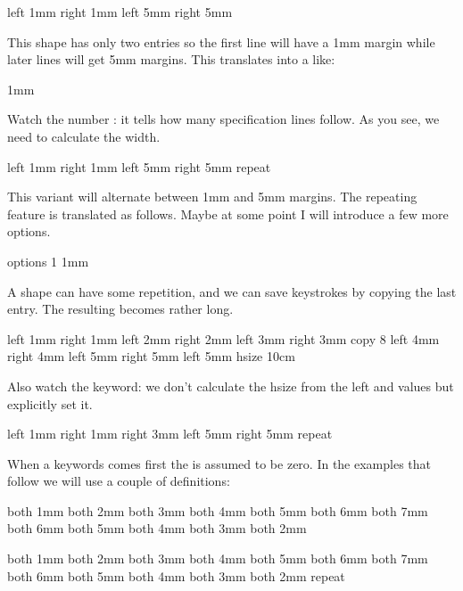 \starttyping[option=TEX]
\startparagraphshape[test]
    left 1mm right 1mm
    left 5mm right 5mm
\stopparagraphshape
\stoptyping

This shape has only two entries so the first line will have a 1mm margin while
later lines will get 5mm margins. This translates into a \type {\parshape} like:

\starttyping[option=TEX]
    1mm \dimexpr\hsize-1mm\relax
    5mm \dimexpr\hsize-5mm\relax
\stoptyping

Watch the number : it tells how many specification lines follow. As you
see, we need to calculate the width.

\starttyping[option=TEX]
\startparagraphshape[test]
    left 1mm right 1mm
    left 5mm right 5mm
    repeat
\stopparagraphshape
\stoptyping

This variant will alternate between 1mm and 5mm margins. The repeating feature is
translated as follows. Maybe at some point I will introduce a few more options.

\starttyping[option=TEX]
 options 1
    1mm \dimexpr\hsize-1mm\relax
    5mm \dimexpr\hsize-5mm\relax
\stoptyping

A shape can have some repetition, and we can save keystrokes by copying the last
entry. The resulting \type {\parshape} becomes rather long.

\starttyping[option=TEX]
\startparagraphshape[test]
    left 1mm right 1mm
    left 2mm right 2mm
    left 3mm right 3mm
    copy 8
    left 4mm right 4mm
    left 5mm right 5mm
    left 5mm hsize 10cm
\stopparagraphshape
\stoptyping

Also watch the  keyword: we don't calculate the hsize from the \type
{left} and  values but explicitly set it.

\starttyping[option=TEX]
\startparagraphshape[test]
    left 1mm right 1mm
    right 3mm
    left 5mm right 5mm
    repeat
\stopparagraphshape
\stoptyping

When a  keywords comes first the  is assumed to be zero.
In the examples that follow we will use a couple of definitions:

\startbuffer[setup]
\startparagraphshape[test]
    both 1mm both 2mm both 3mm both 4mm both 5mm both 6mm
    both 7mm both 6mm both 5mm both 4mm both 3mm both 2mm
\stopparagraphshape
\stopbuffer

    both 1mm both 2mm both 3mm both 4mm both 5mm both 6mm
    both 7mm both 6mm both 5mm both 4mm both 3mm both 2mm
    repeat
\stopparagraphshape
\stopbuffer

